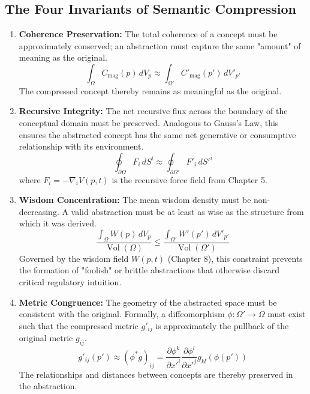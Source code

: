 \subsection{The Four Invariants of Semantic Compression}

\begin{enumerate}
    \item \textbf{Coherence Preservation:} The total coherence of a concept must be approximately conserved; an abstraction must capture the same "amount" of meaning as the original.
    \begin{equation}
    \int_{\Omega} C_{\text{mag}}(p) \, dV_p \approx \int_{\Omega'} C'_{\text{mag}}(p') \, dV'_{p'}
    \end{equation}
    The compressed concept thereby remains as meaningful as the original.

    \item \textbf{Recursive Integrity:} The net recursive flux across the boundary of the conceptual domain must be preserved. Analogous to Gauss's Law, this ensures the abstracted concept has the same net generative or consumptive relationship with its environment.
    \begin{equation}
    \oint_{\partial \Omega} F_i \, dS^i \approx \oint_{\partial \Omega'} F'_i \, dS'^i
    \end{equation}
    where \(F_i = -\nabla_i V(p,t)\) is the recursive force field from Chapter 5.

    \item \textbf{Wisdom Concentration:} The mean wisdom density must be non-decreasing. A valid abstraction must be at least as wise as the structure from which it was derived.
    \begin{equation}
    \frac{\int_{\Omega} W(p) \, dV_p}{\operatorname{Vol}(\Omega)} \leq \frac{\int_{\Omega'} W'(p') \, dV'_{p'}}{\operatorname{Vol}(\Omega')}
    \end{equation}
    Governed by the wisdom field \(W(p,t)\) (Chapter 8), this constraint prevents the formation of "foolish" or brittle abstractions that otherwise discard critical regulatory intuition.

    \item \textbf{Metric Congruence:} The geometry of the abstracted space must be consistent with the original. Formally, a diffeomorphism \(\phi: \Omega' \to \Omega\) must exist such that the compressed metric \(g'_{ij}\) is approximately the pullback of the original metric \(g_{ij}\).
    \begin{equation}
    g'_{ij}(p') \approx (\phi^*g)_{ij} = \frac{\partial \phi^k}{\partial x'^i} \frac{\partial \phi^l}{\partial x'^j} g_{kl}(\phi(p'))
    \end{equation}
    The relationships and distances between concepts are thereby preserved in the abstraction.
\end{enumerate}

